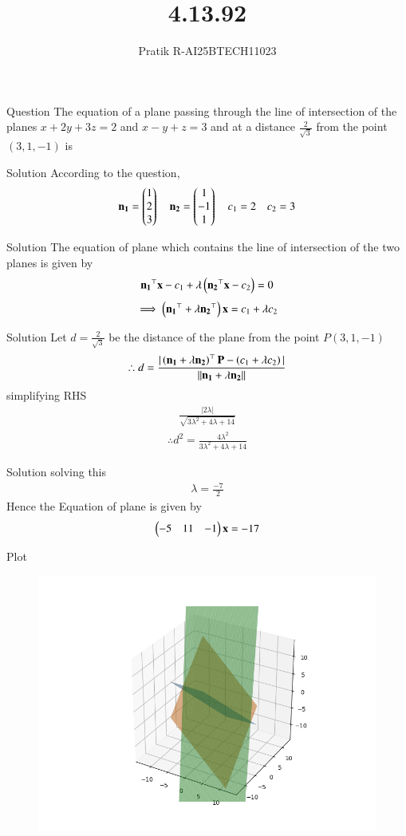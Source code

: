 \documentclass{beamer}
\title %
{4.13.92}
\author %
{Pratik R-AI25BTECH11023}
\begin{document}
\frame{\titlepage}
\begin{frame}{Question}
The equation of a plane passing through the line of intersection of the planes $x+2y+3z=2$ and $x-y + z = 3$ and at a distance $\frac{2}{\sqrt{3}}$ from the point $(3,1,-1)$ is 
\end{frame}
\begin{frame}{Solution}
According to the question,\\
\begin{align}
    \mathbf{n_1}=\begin{pmatrix}1\\2\\3\end{pmatrix} \quad \mathbf{n_2}=\begin{pmatrix}1\\-1\\1\end{pmatrix} \quad c_1=2 \quad c_2=3
\end{align}
\end{frame}
\begin{frame}{Solution}
The equation of plane which contains the line of intersection of the two planes is given by
\begin{align}
    \mathbf{n_1}^{\top}\mathbf{x}-c_1+\lambda\left(\mathbf{n_2}^{\top}\mathbf{x}-c_2\right)=0
\end{align}
\begin{align}
    \implies \left(\mathbf{n_1}^{\top}+\lambda\mathbf{n_2}^{\top}\right)\mathbf{x}=c_1+\lambda c_2
\end{align}
\end{frame}
\begin{frame}{Solution}
Let $d = \frac{2}{\sqrt{3}}$ be the distance of the plane from the point $P(3,1,-1)$ 
\begin{align}
    \therefore d = \frac{|\left(\mathbf{n_1}+\lambda\mathbf{n_2}\right)^{\top}\mathbf{P} - \left(c_1+\lambda c_2\right)|}{||\mathbf{n_1}+\lambda \mathbf{n_2}||}
\end{align}
simplifying RHS
\begin{align}
    \frac{|2\lambda|}{\sqrt{3\lambda ^2 +4\lambda +14}}
\end{align}
\begin{align}
    \therefore d^2= \frac{4\lambda ^2}{3\lambda ^2 +4\lambda +14}
\end{align}
\end{frame}
\begin{frame}{Solution}
solving this
\begin{align}
   \lambda =\frac{-7}{2}
\end{align}
Hence the Equation of plane is given by
\begin{align}
    \begin{pmatrix}-5&11&-1\end{pmatrix}\mathbf{x}=-17
\end{align}

\end{frame}

\begin{frame}{Plot}
    \begin{figure}[H]
    \centering
    \includegraphics[width=0.6\columnwidth]{../figs/fig.png}
    \label{fig:1}
\end{figure}
\end{frame}
\end{document}
